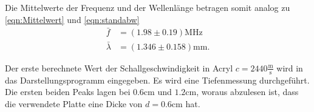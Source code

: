 Die Mittelwerte der Frequenz und der Wellenlänge betragen somit analog zu \autoref{eqn:Mittelwert} und \autoref{eqn:standabw} 
\begin{align*}
  \bar{f} &= (1.98 \pm 0.19) \si{\mega\hertz}\\
  \bar{\lambda} &= (1.346 \pm 0.158) \si{\milli\meter}.
\end{align*}

Der erste berechnete Wert der Schallgeschwindigkeit in Acryl $c=2440 \frac{\si{\meter}}{\si{\second}}$ wird in das Darstellungsprogramm eingegeben.
Es wird eine Tiefenmessung durchgeführt. Die ersten beiden Peaks lagen bei $0.6 \si{\centi\meter}$ und $1.2 \si{\centi\meter}$, woraus abzulesen ist, dass die 
verwendete Platte eine Dicke von $d=0.6\si{\centi\meter}$ hat.\\


